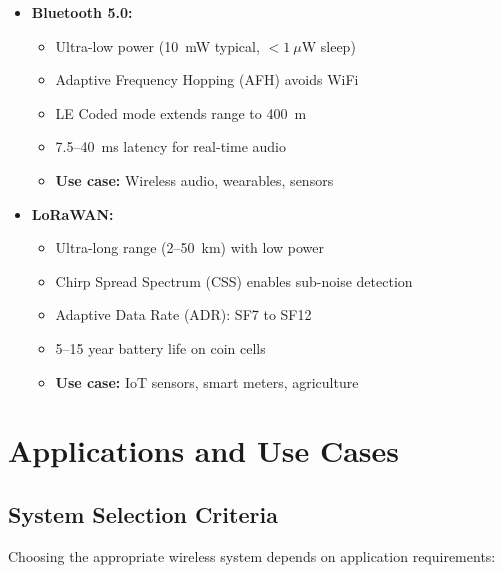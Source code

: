 \begin{itemize}
\item \textbf{Bluetooth 5.0:}
  \begin{itemize}
  \item Ultra-low power (10~mW typical, $<1~\mu$W sleep)
  \item Adaptive Frequency Hopping (AFH) avoids WiFi
  \item LE Coded mode extends range to 400~m
  \item 7.5--40~ms latency for real-time audio
  \item \textbf{Use case:} Wireless audio, wearables, sensors
  \end{itemize}

\item \textbf{LoRaWAN:}
  \begin{itemize}
  \item Ultra-long range (2--50~km) with low power
  \item Chirp Spread Spectrum (CSS) enables sub-noise detection
  \item Adaptive Data Rate (ADR): SF7 to SF12
  \item 5--15 year battery life on coin cells
  \item \textbf{Use case:} IoT sensors, smart meters, agriculture
  \end{itemize}
\end{itemize}

\section{Applications and Use Cases}
\label{sec:applications}

\subsection{System Selection Criteria}

Choosing the appropriate wireless system depends on application requirements:

